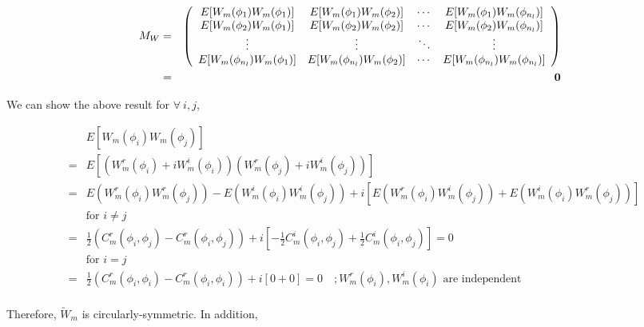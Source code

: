 	\begin{eqnarray*}
		M_W & = & \left(\begin{array}{cccc}
		E[W_m(\phi_1) W_m(\phi_1) ] & E[W_m(\phi_1) W_m(\phi_2) ]  & \cdots & E[W_m(\phi_1) W_m(\phi_{n_l}) ]\\
		E[W_m(\phi_2) W_m(\phi_1) ] & E[W_m(\phi_2) W_m(\phi_2) ]  & \cdots & E[W_m(\phi_2) W_m(\phi_{n_l}) ]\\
		\vdots & \vdots  & \ddots & \vdots \\
		E[W_m(\phi_{n_l}) W_m(\phi_1) ] & E[W_m(\phi_{n_l}) W_m(\phi_2) ]  & \cdots & E[W_m(\phi_{n_l}) W_m(\phi_{n_l})]
		\end{array}
		\right)\\
		&=& {\bf 0}
	\end{eqnarray*}
			
	We can show the above result for $\forall\ i,j$,
			
	\begin{eqnarray*}
		& & E[W_m(\phi_i) W_m(\phi_j) ]\\
		&=& E[(W_m^r(\phi_i) + i W_m^i(\phi_i))(W_m^r(\phi_j) + i W_m^i(\phi_j))] \\
		&=& E(W_m^r(\phi_i)W_m^r(\phi_j)) - E(W_m^i(\phi_i)W_m^i(\phi_j)) + i[E(W_m^r(\phi_i)W_m^i(\phi_j)) + E(W_m^i(\phi_i)W_m^r(\phi_j))] \\
		& & \mbox{for $i \ne j$} \\
		&=& \frac{1}{2}(C_m^r(\phi_i, \phi_j) - C_m^r(\phi_i, \phi_j)) + i [-\frac{1}{2} C_m^i(\phi_i, \phi_j) + \frac{1}{2}C_m^i(\phi_i, \phi_j)] = 0 \\
		& & \mbox{for $i = j$} \\
		&=& \frac{1}{2}(C_m^r(\phi_i, \phi_i) - C_m^r(\phi_i, \phi_i)) + i [0 + 0] = 0 \quad ;W_m^r(\phi_i),W_m^i(\phi_i) \text{ are independent}  \\
	\end{eqnarray*}
			
			
	Therefore, $\utilde{W}_m$ is circularly-symmetric. In addition,
			
